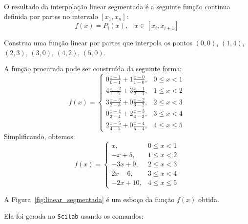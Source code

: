 O resultado da interpolação linear segmentada é a seguinte função contínua definida por partes no intervalo $[x_1,x_n]$:
\begin{equation} f(x)=P_i(x), ~~~~ x\in [x_i,x_{i+1}] \end{equation}

\begin{ex}
  Construa uma função linear por partes que interpola os pontos $(0,0)$, $(1,4)$, $(2,3)$, $(3,0)$, $(4,2)$, $(5,0)$.

A função procurada pode ser construída da seguinte forma:
\begin{equation}
  f(x) = \left\{
    \begin{array}{ll}
      0\frac{x-1}{0-1} + 1\frac{x-0}{1-0} ,& 0 \leq x < 1\\
      4\frac{x-2}{1-2} + 3\frac{x-1}{2-1} ,& 1 \leq x < 2\\
      3\frac{x-3}{2-3} + 0\frac{x-2}{3-2} ,& 2 \leq x < 3\\
      0\frac{x-4}{3-4} + 2\frac{x-3}{4-3} ,& 3 \leq x < 4\\
      2\frac{x-5}{4-5} + 0\frac{x-4}{5-4} ,& 4 \leq x \leq 5
    \end{array}
\right.
\end{equation}
Simplificando, obtemos:
\begin{equation}
  f(x) = \left\{
    \begin{array}{ll}
        x     ,& 0 \leq x < 1\\
       -x + 5 ,& 1 \leq x < 2\\
      -3x + 9 ,& 2 \leq x < 3\\
       2x - 6 ,& 3 \leq x < 4\\
      -2x +10 ,& 4 \leq x \leq 5
    \end{array}
\right.
\end{equation}
\end{ex}

A Figura~\ref{fig:linear_segmentada} é um esboço da função $f(x)$ obtida.

\ifisscilab
Ela foi gerada no \verb+Scilab+ usando os comandos:

\fi

